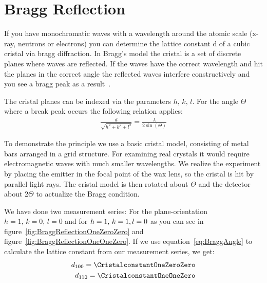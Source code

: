 \documentclass[a4paper,10pt,twocolumn]{article}
\begin{document}

    \section{Bragg Reflection}
    If you have monochromatic waves with a wavelength around the atomic scale (x-ray, neutrons or electrons) you can
    determine the lattice constant d of a cubic cristal via bragg diffraction. 
    In Bragg's model the cristal is a set of discrete planes where waves are reflected.
    If the waves have the correct wavelength and hit the planes in the correct angle the reflected waves interfere 
    constructively and you see a bragg peak as a result~\cite{gerth}.
    
    The cristal planes can be indexed via the parameters $h,\,k,\,l$.
    For the angle $\Theta$ where a break peak occurs the following relation applies:
    \begin{align}
        \label{eq:BraggAngle}
        \frac{d}{\sqrt{h^2+k^2+l^2}} = \frac{\lambda}{2 \sin(\Theta)}
    \end{align}
    
    To demonstrate the principle we use a basic cristal model, consisting of metal bars arranged in a grid structure.
    For examining real crystals it would require electromagnetic waves with much smaller wavelengths.
    We realize the experiment by placing the emitter in the focal point of the wax lens, so the cristal is hit by
    parallel light rays.
    The cristal model is then rotated about $\Theta$ and the detector about $2\Theta$ to actualize the Bragg condition.
    
    We have done two measurement series: For the plane-orientation $h = 1,\,k = 0,\,l = 0$ and for $h = 1,\,k = 1,\\l = 0$ as 
    you can see in figure~\ref{fig:BraggReflectionOneZeroZero} and figure~\ref{fig:BraggReflectionOneOneZero}.
    If we use equation~\eqref{eq:BraggAngle} to calculate the lattice constant from our measurement series, we get:
    \begin{align*}
        d_{100} = \CristalconstantOneZeroZero \\
        d_{110} = \CristalconstantOneOneZero
    \end{align*}
    
\end{document}
